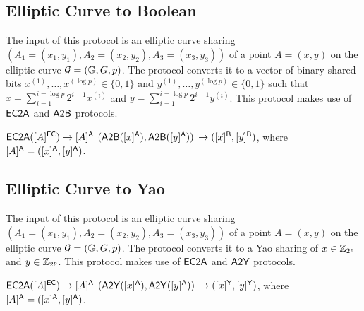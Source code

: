 
\subsection{Elliptic Curve to Boolean}
\begin{algorithm}[H]
\renewcommand{\thealgorithm}{}
\caption{$[A]^\EllipticCurve \rightarrow [A]^\Boolean$}
\label{protocol1}
The input of this protocol is an elliptic curve sharing $(A_1 = (x_1, y_1), A_2 = (x_2, y_2), A_3 = (x_3, y_3))$ of a point $A = (x, y)$ on the elliptic curve $\mathcal{G} = (\mathbb{G}, G, p)$. The protocol converts it to a vector of binary shared bits $x^{(1)}, \ldots, x^{(\log p)} \in \{0, 1\}$ and $y^{(1)}, \ldots, y^{(\log p)} \in \{0, 1\}$ such that $x = \sum_{i = 1}^{i = \log p} 2^{i - 1} x^{(i)}$ and $y = \sum_{i = 1}^{i = \log p} 2^{i - 1} y^{(i)}$. This protocol makes use of $\mathsf{EC2A}$ and $\mathsf{A2B}$ protocols.
\smallskip
\begin{algorithmic}[1]
\STATE $\mathsf{EC2A}([A]^{\mathsf{EC}}) \rightarrow [A]^{\mathsf{A}}$
\STATE $(\mathsf{A2B}([x]^{\mathsf{A}}), \mathsf{A2B}([y]^{\mathsf{A}}))$ $\rightarrow ([\vec{x}]^{\mathsf{B}}, [\vec{y}]^{\mathsf{B}})$, where $[A]^{\mathsf{A}} = ([x]^{\mathsf{A}}, [y]^{\mathsf{A}})$.
\end{algorithmic}
\end{algorithm}


\subsection{Elliptic Curve to Yao}
\begin{algorithm}[H]
\renewcommand{\thealgorithm}{}
\caption{$[A]^\EllipticCurve \rightarrow [A]^\Yao$}
\label{protocol1}
The input of this protocol is an elliptic curve sharing $(A_1 = (x_1, y_1), A_2 = (x_2, y_2), A_3 = (x_3, y_3))$ of a point $A = (x, y)$ on the elliptic curve $\mathcal{G} = (\mathbb{G}, G, p)$. The protocol converts it to a Yao sharing of $x \in \mathbb{Z}_{2^p}$ and $y \in \mathbb{Z}_{2^p}$. This protocol makes use of $\mathsf{EC2A}$ and $\mathsf{A2Y}$ protocols.
\smallskip
\begin{algorithmic}[1]
\STATE $\mathsf{EC2A}([A]^{\mathsf{EC}}) \rightarrow [A]^{\mathsf{A}}$
\STATE $(\mathsf{A2Y}([x]^{\mathsf{A}}), \mathsf{A2Y}([y]^{\mathsf{A}}))$ $\rightarrow ([x]^{\mathsf{Y}}, [y]^{\mathsf{Y}})$, where $[A]^{\mathsf{A}} = ([x]^{\mathsf{A}}, [y]^{\mathsf{A}})$.
\end{algorithmic}
\end{algorithm}

